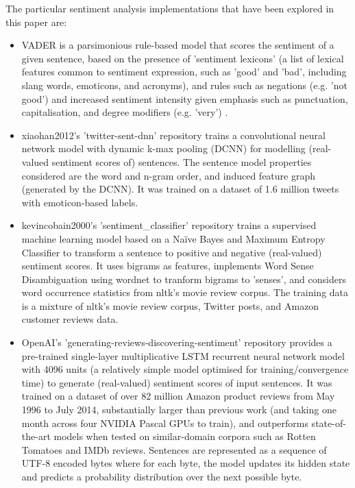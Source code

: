 \documentclass{report}
\begin{document}
The particular sentiment analysis implementations that have been explored in this paper are:
\begin{itemize}
	\item VADER is a parsimonious rule-based model that scores the sentiment of a given sentence, based on the presence of 'sentiment lexicons' (a list of lexical features common to sentiment expression, such as 'good' and 'bad', including slang words, emoticons, and acronyms), and rules such as negations (e.g. 'not good') and increased sentiment intensity given emphasis such as punctuation, capitalisation, and degree modifiers (e.g. 'very') \cite{VADER}.
	\item xiaohan2012's 'twitter-sent-dnn' repository trains a convolutional neural network model with dynamic k-max pooling (DCNN) for modelling (real-valued sentiment scores of) sentences.
		The sentence model properties considered are the word and n-gram order, and induced feature graph (generated by the DCNN).
		It was trained on a dataset of 1.6 million tweets with emoticon-based labels. \cite{kalchbrennerACL2014}
	\item kevincobain2000's 'sentiment\_classifier' repository trains a supervised machine learning model based on a Na\"{i}ve Bayes and Maximum Entropy Classifier to transform a sentence to positive and negative (real-valued) sentiment scores.
		It uses bigrams as features, implements Word Sense Disambiguation using wordnet \cite{banerjee2002adapted} to tranform bigrams to 'senses', and considers word occurrence statistics from nltk's movie review corpus.
		The training data is a mixture of nltk's movie review corpus, Twitter posts, and Amazon customer reviews data. \cite{kevincobain}
	\item OpenAI's 'generating-reviews-discovering-sentiment' repository provides a pre-trained single-layer multiplicative LSTM recurrent neural network model with 4096 units (a relatively simple model optimised for training/convergence time) to generate (real-valued) sentiment scores of input sentences.
		It was trained on a dataset of over 82 million Amazon product reviews from May 1996 to July 2014, substantially larger than previous work (and taking one month across four NVIDIA Pascal GPUs to train), and outperforms state-of-the-art models when tested on similar-domain corpora such as Rotten Tomatoes and IMDb reviews.
		Sentences are represented as a sequence of UTF-8 encoded bytes where for each byte, the model updates its hidden state and predicts a probability distribution over the next possible byte. \cite{OpenAI}

\end{itemize}
\end{document}
